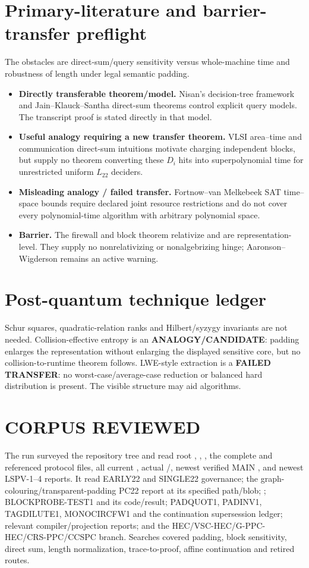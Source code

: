 \documentclass[11pt]{article}
\newcommand{\Ltwo}{L_{22}}
\begin{document}
\section{Primary-literature and barrier-transfer preflight}
The obstacles are direct-sum/query sensitivity versus whole-machine time and
robustness of length under legal semantic padding.
\begin{itemize}[leftmargin=*]
\item \textbf{Directly transferable theorem/model.} Nisan's decision-tree
framework and Jain--Klauck--Santha direct-sum theorems control explicit query
models. The transcript proof is stated directly in that model.
\item \textbf{Useful analogy requiring a new transfer theorem.} VLSI
area--time and communication direct-sum intuitions motivate charging
independent blocks, but supply no theorem converting these $D_i$ hits into
superpolynomial time for unrestricted uniform \(\Ltwo\) deciders.
\item \textbf{Misleading analogy / failed transfer.} Fortnow--van Melkebeek
SAT time--space bounds require declared joint resource restrictions and do
not cover every polynomial-time algorithm with arbitrary polynomial space.
\item \textbf{Barrier.} The firewall and block theorem relativize and are
representation-level. They supply no nonrelativizing or nonalgebrizing hinge;
Aaronson--Wigderson remains an active warning.
\end{itemize}

\section{Post-quantum technique ledger}
Schur squares, quadratic-relation ranks and Hilbert/syzygy invariants are not
needed. Collision-effective entropy is an \textbf{ANALOGY/CANDIDATE}:
padding enlarges the representation without enlarging the displayed sensitive
core, but no collision-to-runtime theorem follows. LWE-style extraction is a
\textbf{FAILED TRANSFER}: no worst-case/average-case reduction or balanced
hard distribution is present. The visible structure may aid algorithms.

\section{CORPUS REVIEWED}
The run surveyed the repository tree and read root ,
, , the complete
 and referenced protocol files, all
current , actual /, newest
verified MAIN
, and newest
LSPV-1--4 reports. It read EARLY22 and SINGLE22 governance; the
graph-colouring/transparent-padding PC22 report at its specified path/blob;
; BLOCKPROBE-TEST1 and its code/result; PADQUOT1, PADINV1,
TAGDILUTE1, MONOCIRCFW1 and the continuation supersession ledger; relevant
compiler/projection reports; and the HEC/VSC-HEC/G-PPC-HEC/CRS-PPC/CCSPC
branch. Searches covered padding, block sensitivity, direct sum, length
normalization, trace-to-proof, affine continuation and retired routes.
\end{document}
